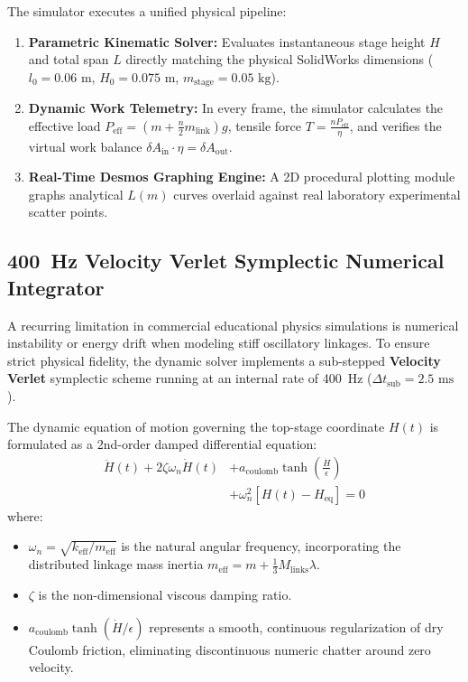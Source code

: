 \documentclass[10pt,twocolumn]{article}
\begin{document}
The simulator executes a unified physical pipeline:
\begin{enumerate}
    \item \textbf{Parametric Kinematic Solver:} Evaluates instantaneous stage height $H$ and total span $L$ directly matching the physical SolidWorks dimensions ($l_0 = 0.06\text{ m}$, $H_0 = 0.075\text{ m}$, $m_{\mathrm{stage}} = 0.05\text{ kg}$).
    \item \textbf{Dynamic Work Telemetry:} In every frame, the simulator calculates the effective load $P_{\mathrm{eff}} = (m + \frac{n}{2} m_{\mathrm{link}})g$, tensile force $T = \frac{n P_{\mathrm{eff}}}{\eta}$, and verifies the virtual work balance $\delta A_{\mathrm{in}} \cdot \eta = \delta A_{\mathrm{out}}$.
    \item \textbf{Real-Time Desmos Graphing Engine:} A 2D procedural plotting module graphs analytical $L(m)$ curves overlaid against real laboratory experimental scatter points.
\end{enumerate}

\subsection{400~Hz Velocity Verlet Symplectic Numerical Integrator}

A recurring limitation in commercial educational physics simulations is numerical instability or energy drift when modeling stiff oscillatory linkages. To ensure strict physical fidelity, the dynamic solver implements a sub-stepped \textbf{Velocity Verlet} symplectic scheme running at an internal rate of 400~Hz ($\Delta t_{\mathrm{sub}} = 2.5\text{ ms}$).

The dynamic equation of motion governing the top-stage coordinate $H(t)$ is formulated as a 2nd-order damped differential equation:
\begin{equation}
\begin{split}
    \ddot{H}(t) + 2 \zeta \omega_n \dot{H}(t) &+ a_{\mathrm{coulomb}} \tanh\left(\frac{\dot{H}}{\epsilon}\right) \\
    &+ \omega_n^2 [H(t) - H_{\mathrm{eq}}] = 0
\end{split}
\label{eq:ode_dynamic}
\end{equation}
where:
\begin{itemize}
    \item $\omega_n = \sqrt{k_{\mathrm{eff}} / m_{\mathrm{eff}}}$ is the natural angular frequency, incorporating the distributed linkage mass inertia $m_{\mathrm{eff}} = m + \frac{1}{3} M_{\mathrm{links}} \lambda$.
    \item $\zeta$ is the non-dimensional viscous damping ratio.
    \item $a_{\mathrm{coulomb}} \tanh(\dot{H} / \epsilon)$ represents a smooth, continuous regularization of dry Coulomb friction, eliminating discontinuous numeric chatter around zero velocity.
\end{itemize}
\end{document}
